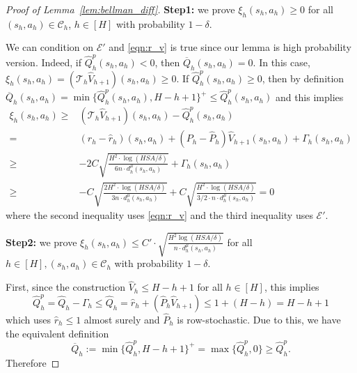 \begin{proof}[Proof of Lemma~\ref{lem:bellman_diff}]
	\textbf{Step1:} we prove $\xi_h(s_h,a_h)\geq 0$ for all $(s_h,a_h)\in\mathcal{C}_h$, $h\in[H]$ with probability $1-\delta$. 
	
	We can condition on $\mathcal{E}'$ and \eqref{eqn:r_v} is true since our lemma is high probability version.
	Indeed, if $\widehat{Q}^p_h(s_h,a_h)<0$, then $\overline{Q}_h(s_h,a_h)=0$. In this case, $\xi_h(s_h,a_h)=(\mathcal{T}_h\widehat{V}_{h+1})(s_h,a_h)\geq 0$. If $\widehat{Q}^p_h(s_h,a_h)\geq 0$, then by definition $\overline{Q}_h(s_h,a_h)=\min\{\widehat{Q}^p_h(s_h,a_h),H-h+1\}^+\leq \widehat{Q}^p_h(s_h,a_h)$ and this implies
	\begin{align*}
	\xi_h(s_h,a_h)\geq& (\mathcal{T}_h\widehat{V}_{h+1})(s_h,a_h)-\widehat{Q}^p_h(s_h,a_h)\\
	=&(r_h-\widehat{r}_h)(s_h,a_h)+(P_h-\widehat{P}_h)\widehat{V}_{h+1}(s_h,a_h)+\Gamma_h(s_h,a_h)\\
	\geq &-{2}C\sqrt{\frac{H^2\cdot\log(HSA/\delta)}{6n \cdot d^\mu_h{(s_h,a_h)}}}+\Gamma_h(s_h,a_h)\\
	\geq &-C\sqrt{\frac{2H^2\cdot\log(HSA/\delta)}{3n \cdot d^\mu_h{(s_h,a_h)}}}+C\sqrt{\frac{H^2\cdot\log(HSA/\delta)}{3/2\cdot n \cdot d^\mu_h{(s_h,a_h)}}}=0
	\end{align*}
	where the second inequality uses \eqref{eqn:r_v} and the third inequality uses $\mathcal{E}'$.
	
	\textbf{Step2:} we prove $\xi_h(s_h,a_h)\leq C'\cdot \sqrt{\frac{H^2\log(HSA/\delta)}{n\cdot d^\mu_h(s_h,a_h)}}$ for all $h\in[H],(s_h,a_h)\in\mathcal{C}_h$ with probability $1-\delta$.
	
	First, since the construction $\widehat{V}_h \leq H-h+1$ for all $h\in[H]$, this implies
	\[
	\widehat{Q}^p_h=\widehat{Q}_h-\Gamma_h\leq \widehat{Q}_h= \widehat{r}_h+(\widehat{P}_{h}\widehat{V}_{h+1})\leq 1+(H-h)=H-h+1
	\]
	which uses $ \widehat{r}_h\leq 1$ almost surely and $\widehat{P}_{h}$ is row-stochastic. Due to this, we have the equivalent definition 
	\[
	\overline{Q}_h:=\min\{\widehat{Q}^p_h,H-h+1\}^+=\max\{\widehat{Q}^p_h,0\}\geq \widehat{Q}^p_h.
	\]
	Therefore
	

\end{proof}
